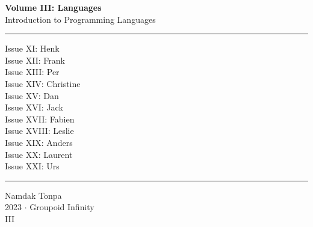 \documentclass{article}
\begin{document}
\begin{titlepage}
    \centering
    \vspace*{0.5in}
    \Huge
    \textbf{Volume III: Languages} \\
    \LARGE
    Introduction to Programming Languages \\
    \vspace{1.5in}
    \rule{\textwidth}{0.4pt}
    \flushleft
    \small
    Issue XI: Henk \\
    Issue XII: Frank \\
    Issue XIII: Per \\
    Issue XIV: Christine \\
    Issue XV: Dan \\
    Issue XVI: Jack \\
    Issue XVII: Fabien \\
    Issue XVIII: Leslie \\
    Issue XIX: Anders \\
    Issue XX: Laurent \\
    Issue XXI: Urs \\
    \rule{\textwidth}{0.4pt}
    \centering
    \vfill
    \large
    Namdak Tonpa \\
    \Large
    2023 $\cdot$ Groupoid Infinity \\
    III
\end{titlepage}

\tableofcontents
\newif\ifincludeTOC
\includeTOCfalse
\newpage \begin{standalone}     \end{standalone} %
\newpage \begin{standalone}   \end{standalone} %
\newpage \begin{standalone}  \end{standalone} %
\newpage \begin{standalone}  \end{standalone}     %
\end{document}
